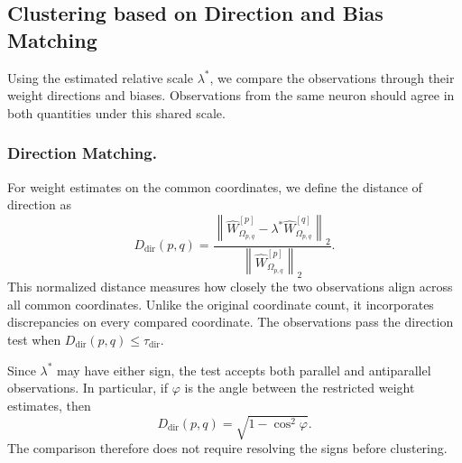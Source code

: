 \documentclass[runningheads]{llncs}
\begin{document}
\subsection{Clustering based on Direction and Bias Matching}
\label{sec:direction-bias}

Using the estimated relative scale $\lambda^*$, we compare the observations through their weight directions and biases.
Observations from the same neuron should agree in both quantities under this shared scale.

\subsubsection{Direction Matching.}
For weight estimates on the common coordinates, we define the distance of direction as
\begin{equation*}
D_{\mathrm{dir}}(p,q)= \frac{\left\|\widehat W_{\Omega_{p,q}}^{[p]}-\lambda^*\widehat W_{\Omega_{p,q}}^{[q]}\right\|_2}{\left\|\widehat W_{\Omega_{p,q}}^{[p]}\right\|_2}.
\end{equation*}
This normalized distance measures how closely the two observations align across all common coordinates.
Unlike the original coordinate count, it incorporates discrepancies on every compared coordinate.
The observations pass the direction test when
$D_{\mathrm{dir}}(p,q)\leq\tau_{\mathrm{dir}}$.

Since $\lambda^*$ may have either sign, the test accepts both parallel and antiparallel observations.
In particular, if $\varphi$ is the angle between the restricted weight estimates, then
\begin{equation*}
 D_{\mathrm{dir}}(p,q)
 =
 \sqrt{1-\cos^2\varphi}.
\end{equation*}
The comparison therefore does not require resolving the signs before clustering.
\end{document}
